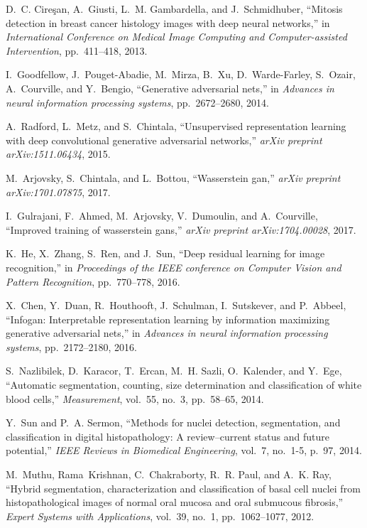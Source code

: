 \documentclass[journal]{IEEEtran}
\begin{document}
\begin{thebibliography}{10}
D.~C. Cire{\c{s}}an, A.~Giusti, L.~M. Gambardella, and J.~Schmidhuber,
  ``Mitosis detection in breast cancer histology images with deep neural
  networks,'' in {\em International Conference on Medical Image Computing and
  Computer-assisted Intervention}, pp.~411--418, 2013.

I.~Goodfellow, J.~Pouget-Abadie, M.~Mirza, B.~Xu, D.~Warde-Farley, S.~Ozair,
  A.~Courville, and Y.~Bengio, ``Generative adversarial nets,'' in {\em
  Advances in neural information processing systems}, pp.~2672--2680, 2014.

A.~Radford, L.~Metz, and S.~Chintala, ``Unsupervised representation learning
  with deep convolutional generative adversarial networks,'' {\em arXiv
  preprint arXiv:1511.06434}, 2015.

M.~Arjovsky, S.~Chintala, and L.~Bottou, ``Wasserstein gan,'' {\em arXiv
  preprint arXiv:1701.07875}, 2017.

I.~Gulrajani, F.~Ahmed, M.~Arjovsky, V.~Dumoulin, and A.~Courville, ``Improved
  training of wasserstein gans,'' {\em arXiv preprint arXiv:1704.00028}, 2017.

K.~He, X.~Zhang, S.~Ren, and J.~Sun, ``Deep residual learning for image
  recognition,'' in {\em Proceedings of the IEEE conference on Computer Vision
  and Pattern Recognition}, pp.~770--778, 2016.

X.~Chen, Y.~Duan, R.~Houthooft, J.~Schulman, I.~Sutskever, and P.~Abbeel,
  ``Infogan: Interpretable representation learning by information maximizing
  generative adversarial nets,'' in {\em Advances in neural information
  processing systems}, pp.~2172--2180, 2016.

S.~Nazlibilek, D.~Karacor, T.~Ercan, M.~H. Sazli, O.~Kalender, and Y.~Ege,
  ``Automatic segmentation, counting, size determination and classification of
  white blood cells,'' {\em Measurement}, vol.~55, no.~3, pp.~58--65, 2014.

Y.~Sun and P.~A. Sermon, ``Methods for nuclei detection, segmentation, and
  classification in digital histopathology: A review--current status and
  future potential,'' {\em IEEE Reviews in Biomedical Engineering}, vol.~7,
  no.~1-5, p.~97, 2014.

M.~Muthu, Rama~Krishnan, C.~Chakraborty, R.~R. Paul, and A.~K. Ray, ``Hybrid
  segmentation, characterization and classification of basal cell nuclei from
  histopathological images of normal oral mucosa and oral submucous fibrosis,''
  {\em Expert Systems with Applications}, vol.~39, no.~1, pp.~1062--1077, 2012.


\end{thebibliography}
\end{document}
